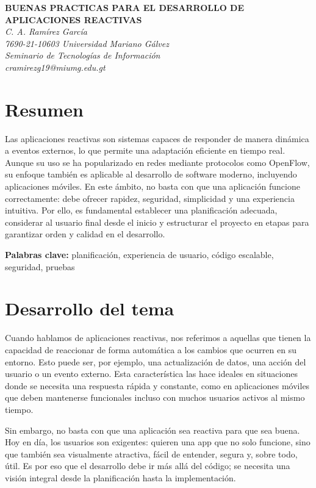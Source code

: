 \documentclass[12pt,letterpaper]{article}
\begin{document}
\begin{center}
    \textbf{\uppercase{BUENAS PRACTICAS PARA EL DESARROLLO DE APLICACIONES REACTIVAS}}\\[1ex]
    \textit{C. A. Ramírez García} \\
    \textit{7690-21-10603  Universidad Mariano Gálvez} \\
    \textit{Seminario de Tecnologías de Información} \\
    \textit{cramirezg19@miumg.edu.gt}
\end{center}

\section*{Resumen}
Las aplicaciones reactivas son sistemas capaces de responder de manera dinámica a eventos externos, lo que permite una adaptación eficiente en tiempo real. Aunque su uso se ha popularizado en redes mediante protocolos como OpenFlow, su enfoque también es aplicable al desarrollo de software moderno, incluyendo aplicaciones móviles. En este ámbito, no basta con que una aplicación funcione correctamente: debe ofrecer rapidez, seguridad, simplicidad y una experiencia intuitiva. Por ello, es fundamental establecer una planificación adecuada, considerar al usuario final desde el inicio y estructurar el proyecto en etapas para garantizar orden y calidad en el desarrollo.


\textbf{Palabras clave:} planificación, experiencia de usuario, código escalable, seguridad, pruebas

\section*{Desarrollo del tema}
Cuando hablamos de aplicaciones reactivas, nos referimos a aquellas que tienen la capacidad de reaccionar de forma automática a los cambios que ocurren en su entorno. Esto puede ser, por ejemplo, una actualización de datos, una acción del usuario o un evento externo. Esta característica las hace ideales en situaciones donde se necesita una respuesta rápida y constante, como en aplicaciones móviles que deben mantenerse funcionales incluso con muchos usuarios activos al mismo tiempo.

Sin embargo, no basta con que una aplicación sea reactiva para que sea buena. Hoy en día, los usuarios son exigentes: quieren una app que no solo funcione, sino que también sea visualmente atractiva, fácil de entender, segura y, sobre todo, útil. Es por eso que el desarrollo debe ir más allá del código; se necesita una visión integral desde la planificación hasta la implementación.
\end{document}
